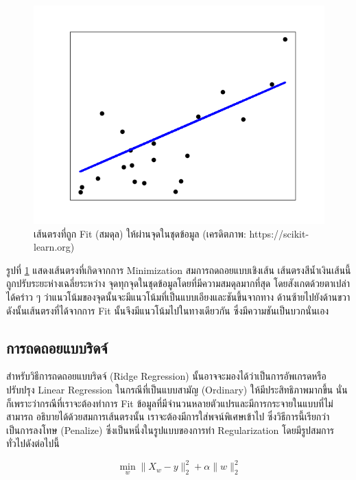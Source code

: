 \begin{figure}[H]
    \centering
    \includegraphics[width=0.8\linewidth]{fig/plot_linear_regression.png}
    \caption{เส้นตรงที่ถูก Fit (สมดุล) ให้ผ่านจุดในชุดข้อมูล (เครดิตภาพ: https://scikit-learn.org)}
    \label{fig:lin_res}
\end{figure}

รูปที่ \ref{fig:lin_res} แสดงเส้นตรงที่เกิดจากการ Minimization สมการถดถอยแบบเชิงเส้น เส้นตรงสีน้ำเงินเส้นนี้ถูกปรับระยะห่างเฉลี่ยระหว่าง%
จุดทุกจุดในชุดข้อมูลโดยที่มีความสมดุลมากที่สุด โดยสังเกตด้วยตาเปล่าได้คร่าว ๆ ว่าแนวโน้มของจุดนั้นจะมีแนวโน้มที่เป็นแบบเอียงและชันขึ้นจากทาง%
ด้านซ้ายไปยังด้านขวา ดังนั้นเส้นตรงที่ได้จากการ Fit นั้นจึงมีแนวโน้มไปในทางเดียวกัน ซึ่งมีความชันเป็นบวกนั่นเอง

\subsection{การถดถอยแบบริดจ์}
\label{ssec:ridge_reg}

สำหรับวิธีการถดถอยแบบริดจ์ (Ridge Regression) นั้นอาจจะมองได้ว่าเป็นการอัพเกรดหรือปรับปรุง Linear Regression ในกรณีที่เป็นแบบสามัญ
(Ordinary) ให้มีประสิทธิภาพมากขึ้น นั่นก็เพราะว่ากรณีที่เราจะต้องทำการ Fit ข้อมูลที่มีจำนวนหลายตัวแปรและมีการกระจายในแบบที่ไม่สามารถ%
อธิบายได้ด้วยสมการเส้นตรงนั้น เราจะต้องมีการใส่พจน์พิเศษเข้าไป ซึ่งวิธีการนี้เรียกว่าเป็นการลงโทษ (Penalize) ซึ่งเป็นหนึ่งในรูปแบบของการทำ
Regularization โดยมีรูปสมการทั่วไปดังต่อไปนี้

\begin{equation}
    \min_{w} \lVert X_{w} - y \rVert_{2}^{2} + \alpha \lVert w \rVert_{2}^{2}
\end{equation}

